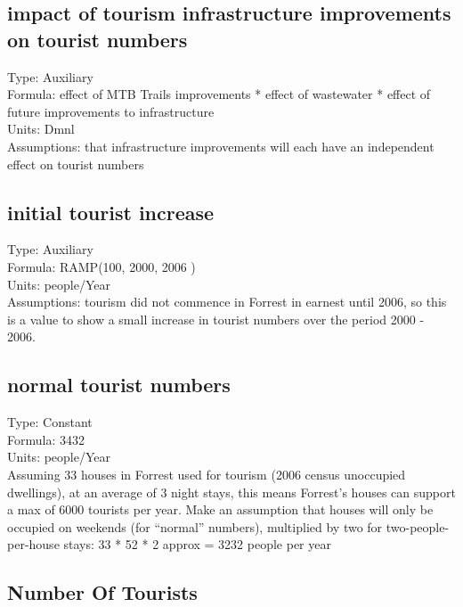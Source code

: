 \documentclass[
  11pt,
]{book}
\begin{document}
\hypertarget{impact-of-tourism-infrastructure-improvements-on-tourist-numbers}{%
\subsection{impact of tourism infrastructure improvements on tourist numbers}\label{impact-of-tourism-infrastructure-improvements-on-tourist-numbers}}

Type: Auxiliary\\
Formula: effect of MTB Trails improvements * effect of wastewater * effect of future improvements to infrastructure\\
Units: Dmnl\\
Assumptions: that infrastructure improvements will each have an independent effect on tourist numbers

\hypertarget{initial-tourist-increase}{%
\subsection{initial tourist increase}\label{initial-tourist-increase}}

Type: Auxiliary\\
Formula: RAMP(100, 2000, 2006 )\\
Units: people/Year\\
Assumptions: tourism did not commence in Forrest in earnest until 2006, so this is a value to show a small increase in tourist numbers over the period 2000 - 2006.

\hypertarget{normal-tourist-numbers}{%
\subsection{normal tourist numbers}\label{normal-tourist-numbers}}

Type: Constant\\
Formula: 3432\\
Units: people/Year\\
Assuming 33 houses in Forrest used for tourism (2006 census unoccupied dwellings), at an average of 3 night stays, this means Forrest's houses can support a max of 6000 tourists per year. Make an assumption that houses will only be occupied on weekends (for ``normal'' numbers), multiplied by two for two-people-per-house stays: 33 * 52 * 2 approx = 3232 people per year

\hypertarget{number-of-tourists}{%
\subsection{Number Of Tourists}\label{number-of-tourists}}
\end{document}
